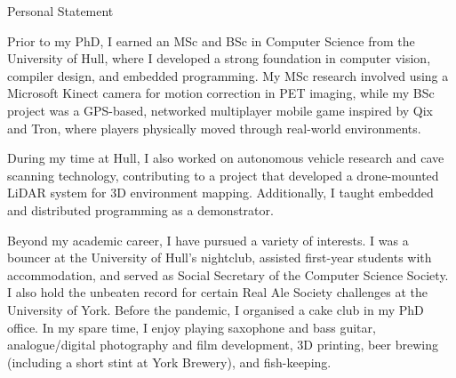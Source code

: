 \documentclass{cv}
\begin{document}
\begin{rSection}{Personal Statement}
        \item Prior to my PhD, I earned an MSc and BSc in Computer Science from the University of Hull, where I developed a strong foundation in computer vision, compiler design, and embedded programming. My MSc research involved using a Microsoft Kinect camera for motion correction in PET imaging, while my BSc project was a GPS-based, networked multiplayer mobile game inspired by Qix and Tron, where players physically moved through real-world environments.

        \item During my time at Hull, I also worked on autonomous vehicle research and cave scanning technology, contributing to a project that developed a drone-mounted LiDAR system for 3D environment mapping. Additionally, I taught embedded and distributed programming as a demonstrator.

        \item Beyond my academic career, I have pursued a variety of interests. I was a bouncer at the University of Hull’s nightclub, assisted first-year students with accommodation, and served as Social Secretary of the Computer Science Society. I also hold the unbeaten record for certain Real Ale Society challenges at the University of York. Before the pandemic, I organised a cake club in my PhD office. In my spare time, I enjoy playing saxophone and bass guitar, analogue/digital photography and film development, 3D printing, beer brewing (including a short stint at York Brewery), and fish-keeping.
    \end{rSection}

    \newpage
    
\end{document}
